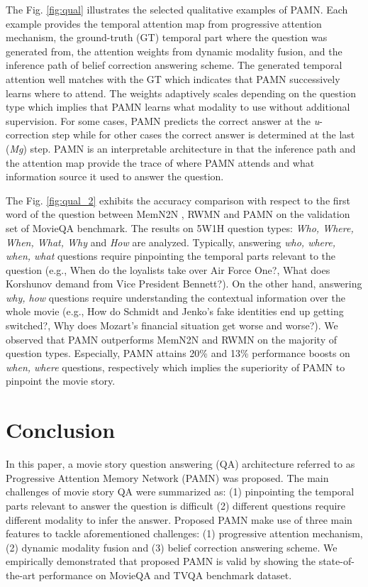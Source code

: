 \documentclass[10pt,twocolumn,letterpaper]{article}
\begin{document}
The Fig. \ref{fig:qual} illustrates the selected qualitative examples of PAMN. Each example provides the temporal attention map  from progressive attention mechanism, the ground-truth (GT) temporal part where the question was generated from, the attention weights  from dynamic modality fusion, and the inference path of belief correction answering scheme. The generated temporal attention well matches with the GT which indicates that PAMN successively learns where to attend. The weights  adaptively scales depending on the question type which implies that PAMN learns what modality to use without additional supervision. For some cases, PAMN predicts the correct answer at the \textit{u}-correction step while for other cases the correct answer is determined at the last (\textit{Mg}) step. PAMN is an interpretable architecture in that the inference path and the attention map provide the trace of where PAMN attends and what information source it used to answer the question.

The Fig. \ref{fig:qual_2} exhibits the accuracy comparison with respect to the first word of the question between MemN2N \cite{MovieQA}, RWMN \cite{rwmn} and PAMN on the validation set of MovieQA benchmark. The results on 5W1H question types: \textit{Who, Where, When, What, Why} and \textit{How} are analyzed. Typically, answering \textit{who, where, when, what} questions require pinpointing the temporal parts relevant to the question (e.g., When do the loyalists take over Air Force One?, What does Korshunov demand from Vice President Bennett?). On the other hand, answering \textit{why, how} questions require understanding the contextual information over the whole movie (e.g., How do Schmidt and Jenko's fake identities end up getting switched?, Why does Mozart's financial situation get worse and worse?). We observed that PAMN outperforms MemN2N and RWMN on the majority of question types. Especially, PAMN attains 20\% and 13\% performance boosts on \textit{when, where} questions, respectively which  implies the superiority of PAMN to pinpoint the movie story.

\section{Conclusion}
\label{sec:5}

In this paper, a movie story question answering (QA) architecture referred to as Progressive Attention Memory Network (PAMN) was proposed. The main challenges of movie story QA were summarized as: (1) pinpointing the temporal parts relevant to answer the question is difficult (2) different questions require different modality to infer the answer. Proposed PAMN make use of three main features to tackle aforementioned challenges: (1) progressive attention mechanism, (2) dynamic modality fusion and (3) belief correction answering scheme. We empirically demonstrated that proposed PAMN is valid by showing the state-of-the-art performance on MovieQA and TVQA benchmark dataset.

{\small


}
\end{document}

